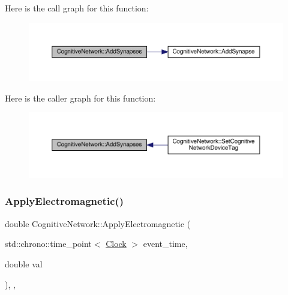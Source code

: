 Here is the call graph for this function\+:
\nopagebreak
\begin{figure}[H]
\begin{center}
\leavevmode
\includegraphics[width=350pt]{class_cognitive_network_a09d9e01cbd8596af7fac626ce2753643_cgraph}
\end{center}
\end{figure}
Here is the caller graph for this function\+:
\nopagebreak
\begin{figure}[H]
\begin{center}
\leavevmode
\includegraphics[width=350pt]{class_cognitive_network_a09d9e01cbd8596af7fac626ce2753643_icgraph}
\end{center}
\end{figure}
\mbox{\label{class_cognitive_network_ae590ecb77db0a876425b9b74bcfe2bce}} 
\subsubsection{\texorpdfstring{Apply\+Electromagnetic()}{ApplyElectromagnetic()}}
{\footnotesize\ttfamily double Cognitive\+Network\+::\+Apply\+Electromagnetic (\begin{DoxyParamCaption}\item[{std\+::chrono\+::time\+\_\+point$<$ \hyperlink{universe_8h_a0ef8d951d1ca5ab3cfaf7ab4c7a6fd80}{Clock} $>$}]{event\+\_\+time,  }\item[{double}]{val }\end{DoxyParamCaption})\hspace{0.3cm}{\ttfamily [inline]}, {\ttfamily [final]}, {\ttfamily [virtual]}}



